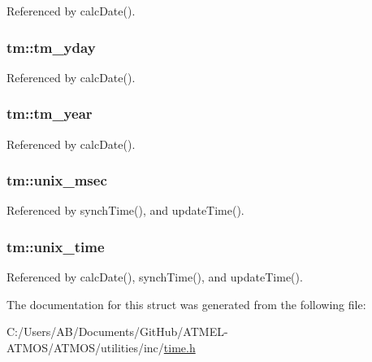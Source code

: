 Referenced by calc\-Date().

\hypertarget{structtm_a352f5ae06f76c1e07e3c79f0d10fa869}{
\subsubsection[{tm\-\_\-yday}]{ tm\-::tm\-\_\-yday}}\label{structtm_a352f5ae06f76c1e07e3c79f0d10fa869}


Referenced by calc\-Date().

\hypertarget{structtm_ab6b14f39f1a3170952a484b05cdedecb}{
\subsubsection[{tm\-\_\-year}]{ tm\-::tm\-\_\-year}}\label{structtm_ab6b14f39f1a3170952a484b05cdedecb}


Referenced by calc\-Date().

\hypertarget{structtm_a6a0b887ef2d300429ce3b807bca855e2}{
\subsubsection[{unix\-\_\-msec}]{ tm\-::unix\-\_\-msec}}\label{structtm_a6a0b887ef2d300429ce3b807bca855e2}


Referenced by synch\-Time(), and update\-Time().

\hypertarget{structtm_a8b444400d47ad20f01dfffdfb7481d8d}{
\subsubsection[{unix\-\_\-time}]{ tm\-::unix\-\_\-time}}\label{structtm_a8b444400d47ad20f01dfffdfb7481d8d}


Referenced by calc\-Date(), synch\-Time(), and update\-Time().



The documentation for this struct was generated from the following file\-:\begin{DoxyCompactItemize}
\item 
C\-:/\-Users/\-A\-B/\-Documents/\-Git\-Hub/\-A\-T\-M\-E\-L-\/\-A\-T\-M\-O\-S/\-A\-T\-M\-O\-S/utilities/inc/\hyperlink{time_8h}{time.\-h}\end{DoxyCompactItemize}
